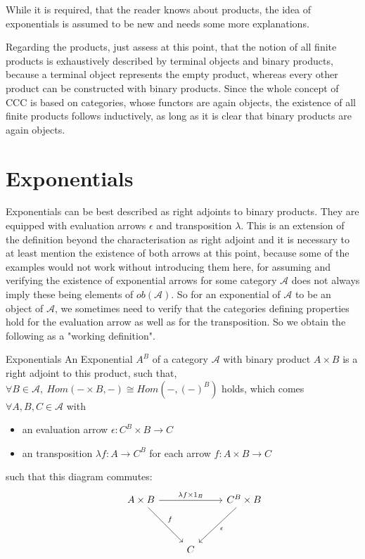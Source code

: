 While it is required, that the reader knows about products, the idea of exponentials is assumed to be new and needs some more explanations.

Regarding the products, just assess at this point, that the notion of all finite products is exhaustively described by terminal objects and binary products, because a terminal object represents the empty product, whereas every other product can be constructed with binary products. Since the whole concept of CCC is based on categories, whose functors are again objects, the existence of all finite products follows inductively, as long as it is clear that binary products are again objects.

\section{Exponentials}

Exponentials can be best described as right adjoints to binary products.
They are equipped with evaluation arrows $\epsilon$ and transposition $\lambda$.
This is an extension of the definition beyond the characterisation as right adjoint and it is necessary to at least mention the existence of both arrows at this point, because some of the examples would not work without introducing them here, for assuming and verifying the existence of exponential arrows for some category $\mathcal{A}$ does not always imply these being elements of $ob(\mathcal{A})$.
So for an exponential of $\mathcal{A}$ to be an object of $\mathcal{A}$, we sometimes need to verify that the categories defining properties hold for the evaluation arrow as well as for the transposition.
So we obtain the following as a "working definition".

\newpage

\begin{definition}{Exponentials}
  An Exponential $A^B$ of a category $\mathcal{A}$ with binary product $A \times B$ is a right adjoint to this product, such that, $\forall B \in \mathcal{A}, \ Hom( - \times B, -) \cong Hom(- , (-)^B)$ holds, which comes $\forall A,B,C \in \mathcal{A}$ with
  \begin{itemize}
    \item an evaluation arrow $\epsilon : C^B \times B \to C$
    \item an transposition $\lambda f: A \to C^B$ for each arrow $f: A \times B \to C$
  \end{itemize}
  such that this diagram commutes:
\[
  \begin{tikzcd}[row sep=huge]
    & A \times B \arrow{dr}{f}  \arrow{rr}{\lambda f \times 1_B} && C^B\times B \arrow{dl}{\epsilon} \\
    &&C 
  \end{tikzcd}
\]
\end{definition}

